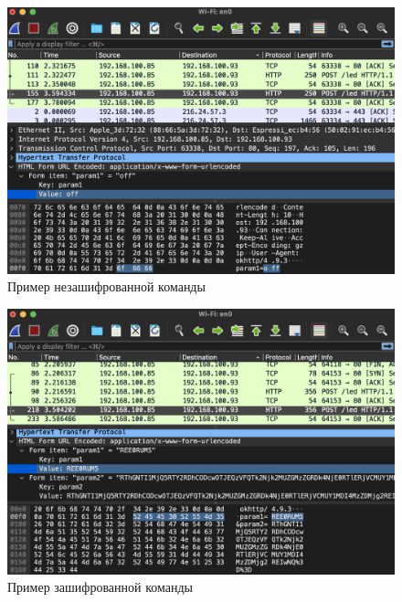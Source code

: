 	\begin{figure}[h]
		\centering
		\includegraphics[scale=0.6]{resources/wireshark-encryption-disabled}
		\caption{Пример незашифрованной команды}
		\label{fig4.8}
	\end{figure}

	\begin{figure}[h]
		\centering
		\includegraphics[scale=0.6]{resources/wireshark-encryption-enabled}
		\caption{Пример зашифрованной команды}
		\label{fig4.9}
	\end{figure}
	